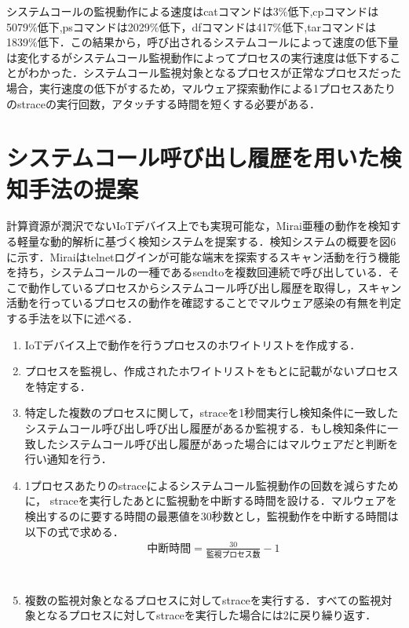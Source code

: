 システムコールの監視動作による速度はcatコマンドは3\%低下,cpコマンドは5079\%低下,psコマンドは2029\%低下，dfコマンドは417\%低下,tarコマンドは1839\%低下．この結果から，呼び出されるシステムコールによって速度の低下量は変化するがシステムコール監視動作によってプロセスの実行速度は低下することがわかった．システムコール監視対象となるプロセスが正常なプロセスだった場合，実行速度の低下がするため，マルウェア探索動作による1プロセスあたりのstraceの実行回数，アタッチする時間を短くする必要がある．



\section{システムコール呼び出し履歴を用いた検知手法の提案}
計算資源が潤沢でないIoTデバイス上でも実現可能な，Mirai亜種の動作を検知する軽量な動的解析に基づく検知システムを提案する．検知システムの概要を図6に示す．Miraiはtelnetログインが可能な端末を探索するスキャン活動を行う機能を持ち，システムコールの一種であるsendtoを複数回連続で呼び出している．そこで動作しているプロセスからシステムコール呼び出し履歴を取得し，スキャン活動を行っているプロセスの動作を確認することでマルウェア感染の有無を判定する手法を以下に述べる．

\begin{enumerate}
 \item IoTデバイス上で動作を行うプロセスのホワイトリストを作成する．
 \item プロセスを監視し、作成されたホワイトリストをもとに記載がないプロセスを特定する．
 \item 特定した複数のプロセスに関して，straceを1秒間実行し検知条件に一致したシステムコール呼び出し呼び出し履歴があるか監視する．もし検知条件に一致したシステムコール呼び出し履歴があった場合にはマルウェアだと判断を行い通知を行う．
 
 \item 1プロセスあたりのstraceによるシステムコール監視動作の回数を減らすために，
 straceを実行したあとに監視動を中断する時間を設ける．マルウェアを検出するのに要する時間の最悪値を30秒数とし，監視動作を中断する時間は以下の式で求める．
 \begin{eqnarray}
 中断時間 = \frac{30}{監視プロセス数} - 1 \\
 \end{eqnarray}
　\item 複数の監視対象となるプロセスに対してstraceを実行する．すべての監視対象となるプロセスに対してstraceを実行した場合には2に戻り繰り返す．
 \end{enumerate}
 
